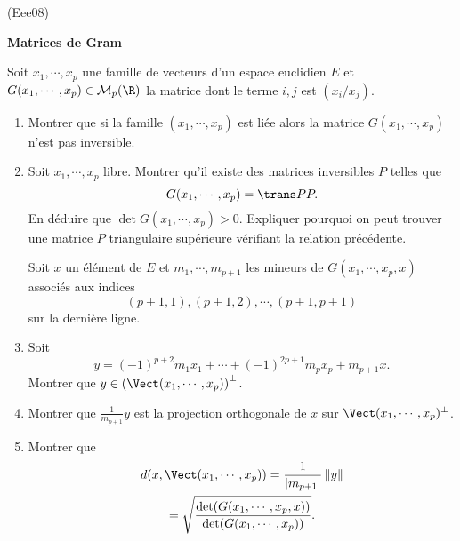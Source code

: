 \begin{tiny}(Eee08)\end{tiny}
\textbf{Matrices de Gram} \par \noindent
Soit $x_{1},\cdots ,x_{p}$ une famille de vecteurs d'un espace euclidien $E$
et $G(x_{1},\cdots ,x_{p})\in \mathcal{M}_{p}(\R)$ la matrice dont
le terme $i,j$ est $(x_{i}/ x_{j})$.
\begin{enumerate}
\item  Montrer que si la famille $(x_{1},\cdots ,x_{p})$ est li{\'e}e alors la matrice  $G(x_{1},\cdots ,x_{p})$ n'est pas inversible.

\item Soit $x_{1},\cdots ,x_{p}$ libre. Montrer qu'il existe des matrices inversibles $P$ telles que
\[
G(x_{1},\cdots ,x_{p}) = \trans P P.
\]
En déduire que $\det G(x_{1},\cdots ,x_{p})>0$. Expliquer pourquoi on peut trouver une matrice $P$ triangulaire supérieure vérifiant la relation précédente.

Soit $x$ un {\'e}l{\'e}ment de $E$ et $m_{1},\cdots ,m_{p+1}$ les mineurs de $G(x_{1},\cdots ,x_{p},x)$ associ{\'e}s aux indices $$(p+1,1),(p+1,2),\cdots ,(p+1,p+1)$$ sur la derni{\`e}re ligne.
\item  Soit 
\[
y=(-1)^{p+2}m_{1}x_{1}+\cdots +(-1)^{2p+1}m_{p}x_{p}+m_{p+1}x.
\]
Montrer que $y\in \left( \Vect(x_{1},\cdots ,x_{p})\right) ^{\perp }$.

\item  Montrer que $\frac{1}{m_{p+1}}y$ est la projection orthogonale de $x$ sur $\Vect(x_{1},\cdots ,x_{p})^{\perp }$.

\item  Montrer que
\begin{multline*}
d(x,\Vect(x_{1},\cdots ,x_{p}))=\frac{1}{\left| m_{p+1}\right| }\left\|y\right\| \\
=\sqrt{\frac{\det (G(x_{1},\cdots ,x_{p},x))}{\det (G(x_{1},\cdots,x_{p}))}}.
\end{multline*}
\end{enumerate}
